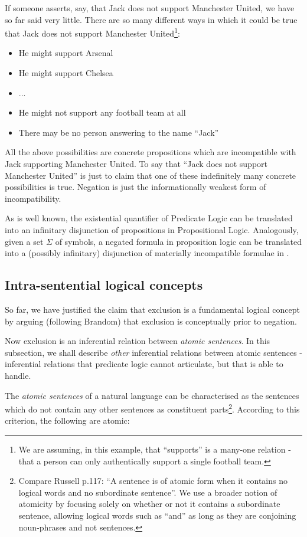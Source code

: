 If someone asserts, say, that Jack does not support Manchester United, we have so far said very little.  
There are so many different ways in which it could be true that Jack does not support Manchester United\footnote{We are assuming, in this example, that ``supports'' is a many-one relation - that a person can only authentically support a single football team.}:
\begin{itemize}
\item
He might support Arsenal
\item
He might support Chelsea
\item
...
\item
He might not support any football team at all
\item
There may be no person answering to the name ``Jack''
\end{itemize}
All the above possibilities are concrete propositions which are incompatible with Jack supporting Manchester United.
To say that ``Jack does not support Manchester United'' is just to claim that one of these indefinitely many concrete possibilities is true.
Negation is just the informationally weakest form of incompatibility.

As is well known, the existential quantifier of Predicate Logic can be translated into an infinitary disjunction of propositions in Propositional Logic.
Analogously, given a set $\Sigma$ of symbols, a negated formula in proposition logic can be translated into a (possibly infinitary)
disjunction of materially incompatible formulae in \ELFULL{}.

\subsection{Intra-sentential logical concepts}

So far, we have justified the claim that exclusion is a fundamental logical concept by arguing (following Brandom) that exclusion is conceptually prior to negation. 

Now exclusion is an inferential relation between \emph{atomic sentences}. 
In this subsection, we shall describe \emph{other} inferential relations between atomic sentences - inferential relations that predicate logic cannot articulate, but that \ELFULL{} is able to handle.

The \emph{atomic sentences} of a natural language can be
characterised as the sentences which do not contain any other
sentences as constituent parts\footnote{Compare Russell \cite{russell}
  p.117: ``A sentence is of atomic form when it contains no logical
  words and no subordinate sentence''. We use a broader notion of
  atomicity by focusing solely on whether or not it contains a
  subordinate sentence, allowing logical words such as ``and'' as long
  as they are conjoining noun-phrases and not sentences.}.  According
to this criterion, the following are atomic:

